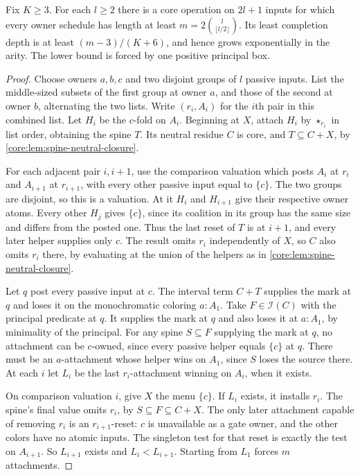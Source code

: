 \begin{theorem}
\label{core:thm:exponential-completion-depth}
Fix $K\ge3$. For each $l\ge2$ there is a core operation on $2l+1$
inputs for which every owner schedule has length at least
$m=2\binom{l}{\lfloor l/2\rfloor}$. Its least completion depth is
at least $(m-3)/(K+6)$, and hence grows exponentially in the arity.
The lower bound is forced by one positive principal box.
\end{theorem}
\begin{proof}
Choose owners $a,b,c$ and two disjoint groups of $l$ passive inputs.
List the middle-sized subsets of the first group at owner $a$, and
those of the second at owner $b$, alternating the two lists. Write
$(r_i,A_i)$ for the $i$th pair in this combined list. Let $H_i$ be
the $c$-fold on $A_i$. Beginning at $X$, attach $H_i$ by $\star_{r_i}$
in list order, obtaining the spine $T$. Its neutral residue $C$ is core,
and $T\subseteq C+X$, by \cref{core:lem:spine-neutral-closure}.

For each adjacent pair $i,i+1$, use the comparison valuation which
posts $A_i$ at $r_i$ and $A_{i+1}$ at $r_{i+1}$, with every other
passive input equal to $\{c\}$. The two groups are disjoint, so this
is a valuation. At it $H_i$ and $H_{i+1}$ give their respective
owner atoms. Every other $H_j$ gives $\{c\}$, since its coalition
in its group has the same size and differs from the posted one.
Thus the last reset of $T$ is at $i+1$, and every later helper
supplies only $c$. The result omits $r_i$ independently of $X$,
so $C$ also omits $r_i$ there, by evaluating at the union of the
helpers as in \cref{core:lem:spine-neutral-closure}.

Let $q$ post every passive input at $c$. The interval term $C+T$
supplies the mark at $q$ and loses it on the monochromatic coloring
$a:A_1$. Take $F\in\mathcal I(C)$ with the principal predicate at
$q$. It supplies the mark at $q$ and also loses it at $a:A_1$,
by minimality of the principal. For any spine $S\subseteq F$ supplying
the mark at $q$, no attachment can be $c$-owned, since every passive
helper equals $\{c\}$ at $q$. There must be an $a$-attachment whose
helper wins on $A_1$, since $S$ loses the source there. At each $i$
let $L_i$ be the last $r_i$-attachment winning on $A_i$, when it exists.

On comparison valuation $i$, give $X$ the menu $\{c\}$. If $L_i$
exists, it installs $r_i$. The spine's final value omits $r_i$, by
$S\subseteq F\subseteq C+X$. The only later attachment capable of
removing $r_i$ is an $r_{i+1}$-reset: $c$ is unavailable as a gate
owner, and the other colors have no atomic inputs. The singleton
test for that reset is exactly the test on $A_{i+1}$. So $L_{i+1}$
exists and $L_i<L_{i+1}$. Starting from $L_1$ forces $m$ attachments.


\end{proof}
